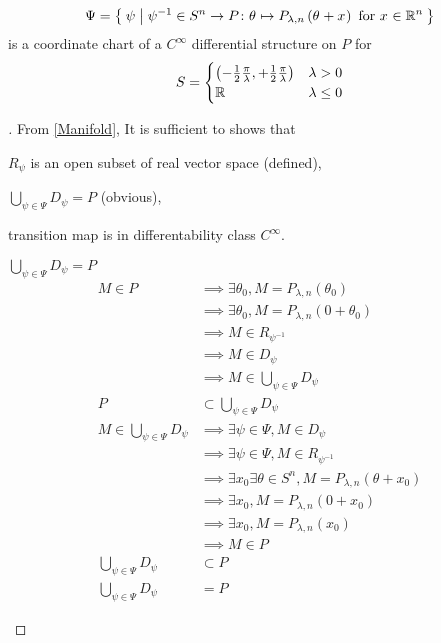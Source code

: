 \documentclass[../main.tex]{subfiles}
\begin{document}
\begin{lemma}\label{M:CoordinateChart}
\[
\Psi=\Set{\psi|
\psi^{-1}
\in S^n\to P
\colon\tensor{\theta}{}\mapsto P_{\lambda,n}\left(\tensor{\theta}{}+\tensor{x}{}\right)
\text{ for }
\tensor{x}{}\in\R^n
}
\] is a coordinate chart of a \(C^\infty\) differential structure on \(P\)
for\[
S=
\begin{cases}
\left(-\frac{1}{2}\frac{\pi}{\lambda},+\frac{1}{2}\frac{\pi}{\lambda}\right)&\text{\(\lambda>0\)}\\
\mathbb{R}&\text{\(\lambda\le0\)}
\end{cases}
\]
\end{lemma}
\begin{proof}[]
From \cref{Manifold}, It is sufficient to shows that
\begin{APAenumerate}
\item \(R_\psi\) is an open subset of real vector space (defined),
\item \(\bigcup_{\psi\in\Psi} D_\psi=P\) (obvious),
\item transition map is in differentability class \(C^\infty\).
\end{APAenumerate}
\begin{subproof}{\(\bigcup_{\psi\in\Psi} D_\psi=P\)}
\begin{align*}
M\in P
&\implies\exists\theta_0, M=P_{\lambda,n}\left(\theta_0\right)\\
&\implies\exists\theta_0, M=P_{\lambda,n}\left(0 +\theta_0\right)\\
&\implies M\in R_{\psi^{-1}}\\
&\implies M\in D_{\psi}\\
&\implies M\in\bigcup_{\psi\in\Psi} D_\psi\\
P&\subset\bigcup_{\psi\in\Psi}D_\psi\\
M\in\bigcup_{\psi\in\Psi} D_\psi
&\implies\exists\psi\in\Psi, M\in D_\psi\\
&\implies\exists\psi\in\Psi, M\in R_{\psi^{-1}}\\
&\implies\exists x_0\exists\theta\in S^n, M=P_{\lambda,n}\left(\theta+x_0\right)\\
&\implies\exists x_0, M=P_{\lambda,n}\left(0+x_0\right)\\
&\implies\exists x_0, M=P_{\lambda,n}\left(x_0\right)\\
&\implies M\in P\\
\bigcup_{\psi\in\Psi}D_\psi&\subset P\\
\bigcup_{\psi\in\Psi} D_\psi&= P
\end{align*}

\end{subproof}
\end{proof}
\end{document}
